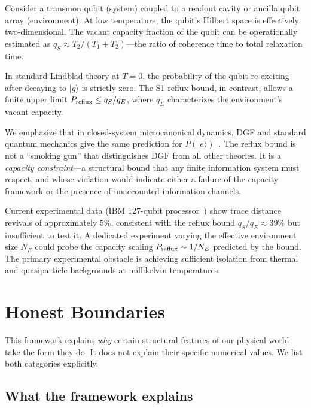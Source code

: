 \documentclass[reprint]{revtex4-2}
\begin{document}
Consider a transmon qubit (system) coupled to a readout cavity or ancilla qubit array (environment). At low temperature, the qubit's Hilbert space is effectively two-dimensional. The vacant capacity fraction of the qubit can be operationally estimated as $q_S \approx T_2/(T_1+T_2)$---the ratio of coherence time to total relaxation time.

In standard Lindblad theory at $T=0$, the probability of the qubit re-exciting after decaying to $|g\rangle$ is strictly zero. The S1 reflux bound, in contrast, allows a finite upper limit $P_{\rm reflux}\le q_S/q_E$, where $q_E$ characterizes the environment's vacant capacity.

We emphasize that in closed-system microcanonical dynamics, DGF and standard quantum mechanics give the same prediction for $P(|e\rangle)$~\cite{circuit_qed_prediction}. The reflux bound is not a ``smoking gun'' that distinguishes DGF from all other theories. It is a \emph{capacity constraint}---a structural bound that any finite information system must respect, and whose violation would indicate either a failure of the capacity framework or the presence of unaccounted information channels.

Current experimental data (IBM 127-qubit processor~\cite{IBM2025}) show trace distance revivals of approximately $5\%$, consistent with the reflux bound $q_S/q_E\approx 39\%$ but insufficient to test it. A dedicated experiment varying the effective environment size $N_E$ could probe the capacity scaling $P_{\rm reflux}\sim 1/N_E$ predicted by the bound. The primary experimental obstacle is achieving sufficient isolation from thermal and quasiparticle backgrounds at millikelvin temperatures.

\section{Honest Boundaries}

This framework explains \emph{why} certain structural features of our physical world take the form they do. It does not explain their specific numerical values. We list both categories explicitly.

\subsection{What the framework explains}
\end{document}
